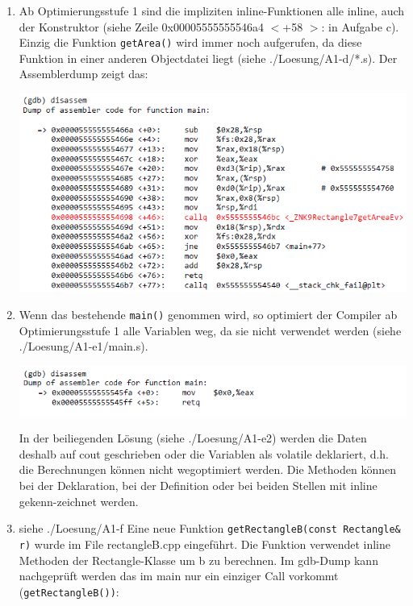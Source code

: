 \begin{enumerate}
\begin{center}
\end{center}

\item Ab Optimierungsstufe 1 sind die impliziten inline-Funktionen alle inline, auch der Konstruktor (siehe Zeile 0x00005555555546a4 $<$+58 $>$: in Aufgabe c). Einzig die Funktion \texttt{getArea()} wird immer noch aufgerufen, da diese Funktion in einer anderen Objectdatei liegt (siehe ./Loesung/A1-d/*.s). Der Assemblerdump zeigt das:

\begin{center}
  \includegraphics[width=.8\linewidth]{900-Praktika/prak07/4.PNG}
\end{center}

\item Wenn das bestehende \texttt{main()} genommen wird, so optimiert der Compiler ab Optimierungsstufe 1 alle Variablen weg, da sie nicht verwendet werden (siehe ./Loesung/A1-e1/main.s).

\begin{center}
  \includegraphics[width=.8\linewidth]{900-Praktika/prak07/7.PNG}
\end{center}


In der beiliegenden Lösung (siehe ./Loesung/A1-e2) werden die Daten deshalb auf cout geschrieben oder die Variablen als volatile deklariert, d.h. die Berechnungen können nicht wegoptimiert werden. Die Methoden können bei der Deklaration, bei der Definition oder bei beiden Stellen mit inline gekenn-zeichnet werden.
\item siehe ./Loesung/A1-f
Eine neue Funktion \texttt{getRectangleB(const Rectangle\& r)} wurde im File rectangleB.cpp eingeführt. Die Funktion verwendet inline Methoden der Rectangle-Klasse um b zu berechnen. Im gdb-Dump kann nachgeprüft werden das im main nur ein einziger Call vorkommt (\texttt{getRectangleB())}:


\end{enumerate}
